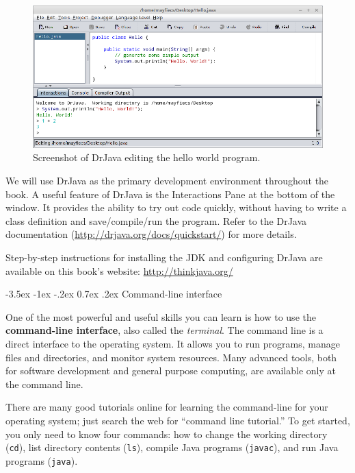 \documentclass[12pt]{book}
\makeatletter
\theoremstyle{exercise}
\renewcommand{\section}{\@startsection{section}{1}{\z@}%
    {-3.5ex \@plus -1ex \@minus -.2ex}%
    {0.7ex \@plus.2ex}%
    {\normalfont\Large\bfseries}}
\makeatother
\begin{document}
\begin{figure}[!h]
\begin{center}
\includegraphics[width=\textwidth]{figs/drjava-hello.png}
\caption{Screenshot of DrJava editing the hello world program.}
\end{center}
\end{figure}


We will use DrJava as the primary development environment throughout the book.
A useful feature of DrJava is the Interactions Pane at the bottom of the window.
It provides the ability to try out code quickly, without having to write a class definition and save/compile/run the program.
Refer to the DrJava documentation (\url{http://drjava.org/docs/quickstart/}) for more details.

Step-by-step instructions for installing the JDK and configuring DrJava are available on this book's website: \url{http://thinkjava.org/}


\section{Command-line interface}
\label{commandline}

One of the most powerful and useful skills you can learn is how to use the {\bf command-line interface}, also called the {\em terminal}.
The command line is a direct interface to the operating system.
It allows you to run programs, manage files and directories, and monitor system resources.
Many advanced tools, both for software development and general purpose computing, are available only at the command line.

There are many good tutorials online for learning the command-line for your operating system; just search the web for ``command line tutorial.''
To get started, you only need to know four commands: how to change the working directory ({\tt cd}), list directory contents ({\tt ls}), compile Java programs ({\tt javac}), and run Java programs ({\tt java}).
\end{document}

